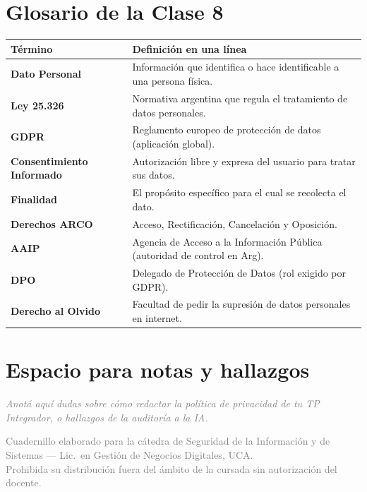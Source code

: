 \documentclass[12pt,a4paper]{article}
\renewcommand{\arraystretch}{1.25}
\begin{document}
\newpage
\section{Glosario de la Clase 8}

\renewcommand{\arraystretch}{1.4}
\begin{tabularx}{\textwidth}{>{\bfseries}p{4.5cm}X}
\toprule
\textbf{T\'ermino} & \textbf{Definici\'on en una l\'inea} \\
\midrule
Dato Personal & Informaci\'on que identifica o hace identificable a una persona f\'isica. \\
Ley 25.326 & Normativa argentina que regula el tratamiento de datos personales. \\
GDPR & Reglamento europeo de protecci\'on de datos (aplicaci\'on global). \\
Consentimiento Informado & Autorizaci\'on libre y expresa del usuario para tratar sus datos. \\
Finalidad & El prop\'osito espec\'ifico para el cual se recolecta el dato. \\
Derechos ARCO & Acceso, Rectificaci\'on, Cancelaci\'on y Oposici\'on. \\
AAIP & Agencia de Acceso a la Informaci\'on P\'ublica (autoridad de control en Arg). \\
DPO & Delegado de Protecci\'on de Datos (rol exigido por GDPR). \\
Derecho al Olvido & Facultad de pedir la supresi\'on de datos personales en internet. \\
\bottomrule
\end{tabularx}

\vspace{1cm}

\section{Espacio para notas y hallazgos}

\begin{tcolorbox}[colback=grisClaro, colframe=gray!50, arc=2mm, height=7cm]
\textcolor{gray}{\itshape Anot\'a aqu\'i dudas sobre c\'omo redactar la pol\'itica de privacidad de tu TP Integrador, o hallazgos de la auditor\'ia a la IA.}
\end{tcolorbox}

\vfill
\begin{center}
\small\textcolor{gray}{%
Cuadernillo elaborado para la c\'atedra de Seguridad de la Informaci\'on y de
Sistemas --- Lic.\ en Gesti\'on de Negocios Digitales, UCA.\\
Prohibida su distribuci\'on fuera del \'ambito de la cursada sin autorizaci\'on del docente.}
\end{center}
\end{document}
